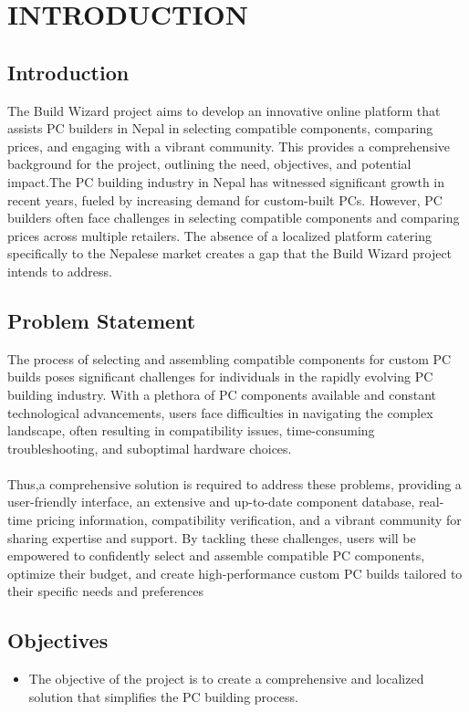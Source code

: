 \chapter{INTRODUCTION}



\section{Introduction}
The Build Wizard project aims to develop an innovative online platform that assists PC builders in Nepal in selecting compatible components, comparing prices, and engaging with a vibrant community. This  provides a comprehensive background for the project, outlining the need, objectives, and potential impact.The PC building industry in Nepal has witnessed significant growth in recent years, fueled by increasing demand for custom-built PCs. However, PC builders often face challenges in selecting compatible components and comparing prices across multiple retailers. The absence of a localized platform catering specifically to the Nepalese market creates a gap that the Build Wizard project intends to address.
\section{Problem Statement}

The process of selecting and assembling compatible components for custom PC builds poses significant challenges for individuals in the rapidly evolving PC building industry. With a plethora of PC components available and constant technological advancements, users face difficulties in navigating the complex landscape, often resulting in compatibility issues, time-consuming troubleshooting, and suboptimal hardware choices.\\\\
Thus,a comprehensive solution is required to address these problems, providing a user-friendly interface, an extensive and up-to-date component database, real-time pricing information, compatibility verification, and a vibrant community for sharing expertise and support. By tackling these challenges, users will be empowered to confidently select and assemble compatible PC components, optimize their budget, and create high-performance custom PC builds tailored to their specific needs and preferences
\section{Objectives}
\begin{itemize}
    \item The objective of the project is to create a comprehensive and localized solution that simplifies the PC building process.
\end{itemize}
